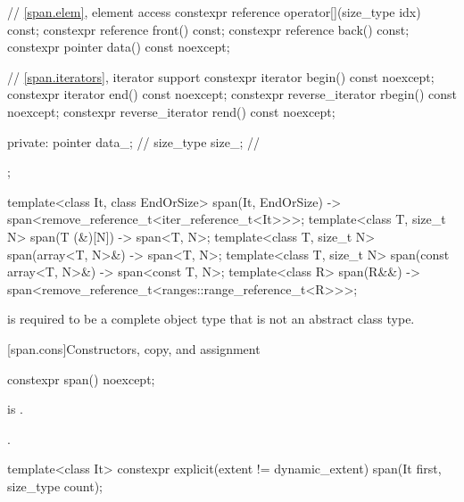 \begin{codeblock}
{{    // \ref{span.elem}, element access
    constexpr reference operator[](size_type idx) const;
    constexpr reference front() const;
    constexpr reference back() const;
    constexpr pointer data() const noexcept;

    // \ref{span.iterators}, iterator support
    constexpr iterator begin() const noexcept;
    constexpr iterator end() const noexcept;
    constexpr reverse_iterator rbegin() const noexcept;
    constexpr reverse_iterator rend() const noexcept;

  private:
    pointer data_;              // \expos
    size_type size_;            // \expos
  };

  template<class It, class EndOrSize>
    span(It, EndOrSize) -> span<remove_reference_t<iter_reference_t<It>>>;
  template<class T, size_t N>
    span(T (&)[N]) -> span<T, N>;
  template<class T, size_t N>
    span(array<T, N>&) -> span<T, N>;
  template<class T, size_t N>
    span(const array<T, N>&) -> span<const T, N>;
  template<class R>
    span(R&&) -> span<remove_reference_t<ranges::range_reference_t<R>>>;
}
\end{codeblock}

\pnum
{} is required to be
a complete object type that is not an abstract class type.

[span.cons]{Constructors, copy, and assignment}

%
\begin{itemdecl}
constexpr span() noexcept;
\end{itemdecl}

\begin{itemdescr}
\pnum
\constraints
{} is .

\pnum
\ensures
{}.
\end{itemdescr}

%
\begin{itemdecl}
template<class It>
  constexpr explicit(extent != dynamic_extent) span(It first, size_type count);
\end{itemdecl}

